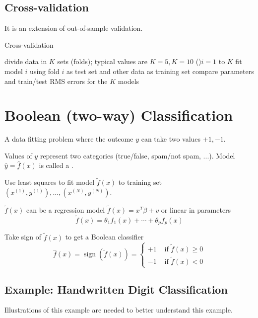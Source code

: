 \subsection{Cross-validation}

It is an extension of out-of-sample validation.

\begin{algorithm}[htbp]
    \caption{Cross-validation}
    divide data in $ K $ sets (folds); typical values are $ K=5, K=10 $\;
    \For(){$ i=1 $ to $ K $}{
        fit model $ i $ using fold $ i $ as test set and other data as training set\;
        compare parameters and train/test RMS errors for the $ K $ models
    }
\end{algorithm}


\section{Boolean (two-way) Classification}

\begin{problem}
    A data fitting problem where the outcome $ y $ can take two values $ +1,-1 $.

    Values of $ y $ represent two categories (true/false, spam/not spam, ...). Model $ \hat{y}=\hat{f}(x) $ is called a .

\end{problem}

Use least squares to fit model $ \tilde{f}(x) $ to training set $ \left(x^{(1)}, y^{(1)}\right), \ldots,\left(x^{(N)}, y^{(N)}\right) $.

$ \tilde{f}(x) $ can be a regression model $ \tilde{f}(x)=x^{T} \beta+v $ or linear in parameters
$$
\tilde{f}(x)=\theta_{1} f_{1}(x)+\cdots+\theta_{p} f_{p}(x)
$$

Take sign of $ \tilde{f}(x) $ to get a Boolean classifier
$$
\hat{f}(x)=\operatorname{sign}(\tilde{f}(x))=\left\{\begin{array}{ll}
+1 & \text { if } \tilde{f}(x) \geq 0 \\
-1 & \text { if } \tilde{f}(x)<0
\end{array}\right.
$$

\subsection{Example: Handwritten Digit Classification}

\begin{remark}
    Illustrations of this example are needed to better understand this example.
\end{remark}

